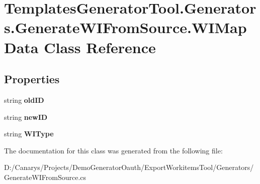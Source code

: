 \hypertarget{class_templates_generator_tool_1_1_generators_1_1_generate_w_i_from_source_1_1_w_i_map_data}{}\section{Templates\+Generator\+Tool.\+Generators.\+Generate\+W\+I\+From\+Source.\+W\+I\+Map\+Data Class Reference}
\label{class_templates_generator_tool_1_1_generators_1_1_generate_w_i_from_source_1_1_w_i_map_data}
\subsection*{Properties}
\begin{DoxyCompactItemize}
\item 
\mbox{\label{class_templates_generator_tool_1_1_generators_1_1_generate_w_i_from_source_1_1_w_i_map_data_accea8c3c9fc05b21eef603dc4c43d0f6}} 
string {\bfseries old\+ID}
\item 
\mbox{\label{class_templates_generator_tool_1_1_generators_1_1_generate_w_i_from_source_1_1_w_i_map_data_a19a99c510e350d27d0f17fd295da7934}} 
string {\bfseries new\+ID}
\item 
\mbox{\label{class_templates_generator_tool_1_1_generators_1_1_generate_w_i_from_source_1_1_w_i_map_data_a7c0a29eb161249ddbfa046507fa9ed95}} 
string {\bfseries W\+I\+Type}
\end{DoxyCompactItemize}


The documentation for this class was generated from the following file\+:\begin{DoxyCompactItemize}
\item 
D\+:/\+Canarys/\+Projects/\+Demo\+Generator\+Oauth/\+Export\+Workitems\+Tool/\+Generators/Generate\+W\+I\+From\+Source.\+cs\end{DoxyCompactItemize}
